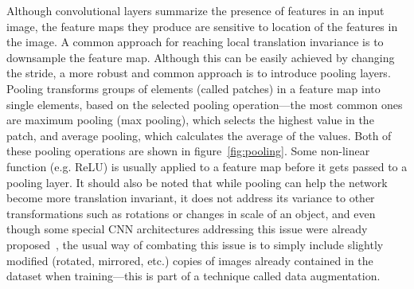 Although convolutional layers summarize the presence of features in an input image,
the feature maps they produce are sensitive to location of the features in the image.
A common approach for reaching local translation invariance is to downsample the feature map.
Although this can be easily achieved by changing the stride, a more robust and common
approach is to introduce pooling layers. Pooling transforms groups of elements (called patches) in a feature map
into single elements, based on the selected pooling operation---the most common ones are maximum pooling (max pooling),
which selects the highest value in the patch, and average pooling, which calculates the average of the
values. Both of these pooling operations are shown in figure~\ref{fig:pooling}.
Some non-linear function (e.g. ReLU) is usually applied to a feature map before it gets passed to
a pooling layer. It should also be noted that while pooling can help the network become more translation invariant,
it does not address its variance to other transformations such as rotations or changes in scale of an object,
and even though some special CNN architectures addressing this issue were already proposed~\cite{li2017rotation},
the usual way of combating this issue is to simply include slightly modified (rotated, mirrored, etc.)
copies of images already contained in the dataset when training---this is part of a technique
called data augmentation.


